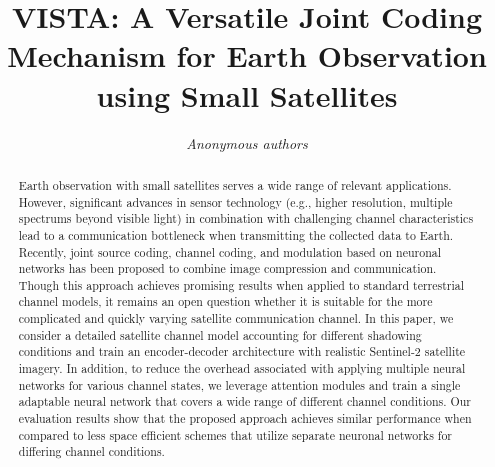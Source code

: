 \documentclass[conference]{IEEEtran}
\newcommand\sentinelii{Sentinel-2\xspace}
\begin{document}
\title{VISTA: A Versatile Joint Coding Mechanism for Earth Observation using Small Satellites}

\author{\emph{Anonymous authors}}

\maketitle

\begin{abstract}
Earth observation with small satellites serves a wide range of relevant applications.
However, significant advances in sensor technology (e.g., higher resolution, multiple spectrums beyond visible light) in combination with challenging channel characteristics lead to a communication bottleneck 
when transmitting the collected data to Earth.
Recently, joint source coding, channel coding, and modulation based on neuronal networks has been proposed to combine image compression and communication. %
Though this approach achieves promising results when applied to standard terrestrial channel models, 
it remains an open question whether it is suitable for the more complicated and quickly varying satellite communication channel. 
In this paper, we consider a detailed satellite channel model accounting for different shadowing conditions and train an encoder-decoder architecture with realistic \sentinelii satellite imagery.
In addition, to reduce the overhead associated with applying multiple neural networks for various channel states, 
we leverage attention modules and train a single adaptable neural network that covers a wide range of different channel conditions.
Our evaluation results show that the proposed approach achieves similar performance when compared to less space efficient schemes that utilize separate neuronal networks for differing channel conditions.   
\end{abstract}
\end{document}
